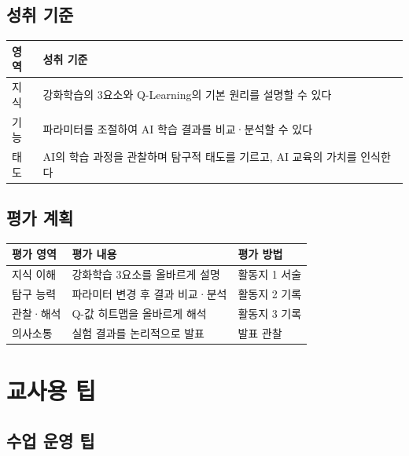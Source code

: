 \documentclass[11pt,a4paper]{article}
\begin{document}
\subsection{성취 기준}

\begin{center}
\renewcommand{\arraystretch}{1.4}
\begin{tabular}{|l|p{9cm}|}
\hline
\rowcolor{tableheader}
\textbf{영역} & \textbf{성취 기준} \\
\hline
지식 & 강화학습의 3요소와 Q-Learning의 기본 원리를 설명할 수 있다 \\
\hline
기능 & 파라미터를 조절하여 AI 학습 결과를 비교·분석할 수 있다 \\
\hline
태도 & AI의 학습 과정을 관찰하며 탐구적 태도를 기르고, AI 교육의 가치를 인식한다 \\
\hline
\end{tabular}
\end{center}

\subsection{평가 계획}

\begin{center}
\renewcommand{\arraystretch}{1.4}
\begin{tabular}{|l|p{5cm}|l|}
\hline
\rowcolor{tableheader}
\textbf{평가 영역} & \textbf{평가 내용} & \textbf{평가 방법} \\
\hline
지식 이해 & 강화학습 3요소를 올바르게 설명 & 활동지 1 서술 \\
\hline
탐구 능력 & 파라미터 변경 후 결과 비교·분석 & 활동지 2 기록 \\
\hline
관찰·해석 & Q-값 히트맵을 올바르게 해석 & 활동지 3 기록 \\
\hline
의사소통 & 실험 결과를 논리적으로 발표 & 발표 관찰 \\
\hline
\end{tabular}
\end{center}

\section{교사용 팁}

\subsection{수업 운영 팁}
\end{document}
